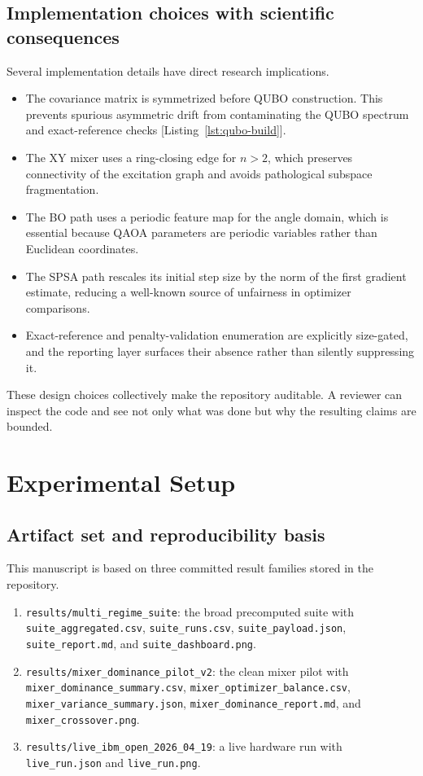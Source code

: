 \documentclass[11pt]{article}
\begin{document}
\subsection{Implementation choices with scientific consequences}

Several implementation details have direct research implications.
\begin{itemize}[leftmargin=1.5em]
\item The covariance matrix is symmetrized before QUBO construction. This prevents spurious asymmetric drift from contaminating the QUBO spectrum and exact-reference checks [Listing~\ref{lst:qubo-build}].
\item The \(\mathrm{XY}\) mixer uses a ring-closing edge for \(n>2\), which preserves connectivity of the excitation graph and avoids pathological subspace fragmentation.
\item The BO path uses a periodic feature map for the angle domain, which is essential because QAOA parameters are periodic variables rather than Euclidean coordinates.
\item The SPSA path rescales its initial step size by the norm of the first gradient estimate, reducing a well-known source of unfairness in optimizer comparisons.
\item Exact-reference and penalty-validation enumeration are explicitly size-gated, and the reporting layer surfaces their absence rather than silently suppressing it.
\end{itemize}

These design choices collectively make the repository auditable. A reviewer can inspect the code and see not only what was done but why the resulting claims are bounded.

\section{Experimental Setup}\label{sec:experimental}

\subsection{Artifact set and reproducibility basis}

This manuscript is based on three committed result families stored in the repository.
\begin{enumerate}[leftmargin=1.5em]
\item \texttt{results/multi\_regime\_suite}: the broad precomputed suite with \texttt{suite\_aggregated.csv}, \texttt{suite\_runs.csv}, \texttt{suite\_payload.json}, \texttt{suite\_report.md}, and \texttt{suite\_dashboard.png}.
\item \texttt{results/mixer\_dominance\_pilot\_v2}: the clean mixer pilot with \texttt{mixer\_dominance\_summary.csv}, \texttt{mixer\_optimizer\_balance.csv}, \texttt{mixer\_variance\_summary.json}, \texttt{mixer\_dominance\_report.md}, and \texttt{mixer\_crossover.png}.
\item \texttt{results/live\_ibm\_open\_2026\_04\_19}: a live hardware run with \texttt{live\_run.json} and \texttt{live\_run.png}.
\end{enumerate}
\end{document}
